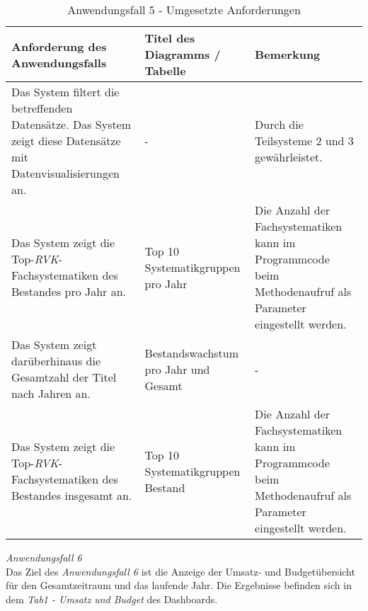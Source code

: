 \begingroup
    \setlength{\tabcolsep}{12pt} %
    \renewcommand{\arraystretch}{1.2} 
    \begin{table}[H]
        \centering
        \large
        \begin{adjustbox}{max width=\textwidth}
        \begin{tabular}{p{}p{}p{}}
           \toprule
           Anforderung des Anwendungsfalls        &Titel des Diagramms / Tabelle &Bemerkung\\
           \midrule
           Das System filtert die betreffenden Datensätze. Das System zeigt diese Datensätze mit Datenvisualisierungen an.&-&Durch die Teilsysteme 2 und 3 gewährleistet.\\
           Das System zeigt die Top-\textit{\acrshort{RVK}}-Fachsystematiken des Bestandes pro Jahr an.&Top 10 Systematikgruppen pro Jahr&Die Anzahl der Fachsystematiken kann im Programmcode beim Methodenaufruf als Parameter eingestellt werden.\\
           Das System zeigt darüberhinaus die Gesamtzahl der Titel nach Jahren an.&Bestandswachstum pro Jahr und Gesamt&-\\
           Das System zeigt die Top-\textit{\acrshort{RVK}}-Fachsystematiken des Bestandes insgesamt an.&Top 10 Systematikgruppen Bestand&Die Anzahl der Fachsystematiken kann im Programmcode beim Methodenaufruf als Parameter eingestellt werden.\\
        \bottomrule
        \end{tabular}
        \end{adjustbox}
        \caption{%
            Anwendungsfall 5 - Umgesetzte Anforderungen
        }
        \label{tab:Anwendungsfall 5 - Umgesetzte Anforderungen}
        \end{table}
\endgroup

\clearpage
\noindent
\textit{Anwendungsfall 6}\\
Das Ziel des \textit{Anwendungsfall 6} ist die Anzeige der Umsatz- und Budgetübersicht für den Gesamtzeitraum und das laufende Jahr.
Die Ergebnisse befinden sich in dem \textit{Tab1 - Umsatz und Budget} des Dashboards.

